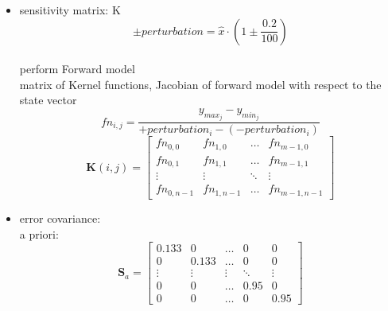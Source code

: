 \begin{itemize}
	\item sensitivity matrix: K \\
	$$\pm perturbation = \hat{x} \cdot \left(1 \pm \frac{0.2}{100}\right)$$ \\
	perform Forward model \\
	matrix of Kernel functions, Jacobian of forward model with respect to the state vector 
	$$fn_{i,j} = \frac{y_{max_j} - y_{min_j}}{+ perturbation_i - (- perturbation_i)}$$
	$$\mathbf{K}(i,j) = \begin{bmatrix}
	fn_{0,0} 	& fn_{1,0} 		& \ldots & fn_{m-1,0} \\
	fn_{0,1} 	& fn_{1,1}	 	& \ldots & fn_{m-1,1} \\
	\vdots	 	& \vdots		& \ddots & \vdots 	\\
	fn_{0,n-1} 	& fn_{1,n-1}	& \ldots & fn_{m-1,n-1}
	\end{bmatrix}$$
	\item error covariance: \\
	a priori: $$
	\mathbf{S}_a = \begin{bmatrix}
	0.133 	& 0 	& \dots & 0 		& 0         \\%
	0		& 0.133 & \dots	& 0 		& 0		 \\
	\vdots 	& \vdots& \vdots& \ddots 	& \vdots \\
	0		& 0		& \dots	& 0.95 		& 0 \\
	0 		& 0		& \dots & 0 		& 0.95
	\end{bmatrix} $$
	

\end{itemize}
